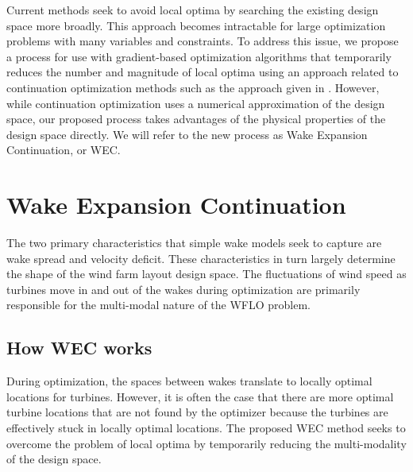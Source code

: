\documentclass[a4paper]{jpconf}
\begin{document}
Current methods seek to avoid local optima by searching the existing design space more broadly. This approach becomes intractable for large optimization problems with many variables and constraints. To address this issue, we propose a process for use with gradient-based optimization algorithms that temporarily reduces the number and magnitude of local optima using an approach related to continuation optimization methods such as the approach given in \cite{mobahi2015}. However, while continuation optimization uses a numerical approximation of the design space, our proposed process takes advantages of the physical properties of the design space directly. We will refer to the new process as Wake Expansion Continuation, or WEC.

\section{Wake Expansion Continuation}\label{sec:dsrop}
The two primary characteristics that simple wake models seek to capture are wake spread and velocity deficit. These characteristics in turn largely determine the shape of the wind farm layout design space. The fluctuations of wind speed as turbines move in and out of the wakes during optimization are primarily responsible for the multi-modal nature of the WFLO problem. 

\subsection{How WEC works}
During optimization, the spaces between wakes translate to locally optimal locations for turbines. However, it is often the case that there are more optimal turbine locations that are not found by the optimizer because the turbines are effectively stuck in locally optimal locations. The proposed WEC method seeks to overcome the problem of local optima by temporarily reducing the multi-modality of the design space. 
\end{document}
